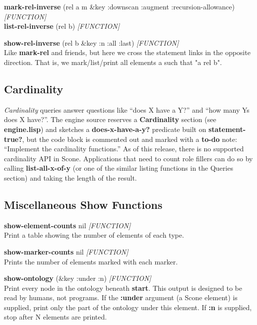 \documentclass[titlepage,twoside,openright,11pt]{article}
\begin{document}
\textbf{mark-rel-inverse} (rel a m \&key :downscan :augment
:recursion-allowance) \emph{{[}FUNCTION{]}\\
}\textbf{list-rel-inverse} (rel b) \emph{{[}FUNCTION{]}}

\textbf{show-rel-inverse} (rel b \&key :n :all :last)
\emph{{[}FUNCTION{]}}\\
Like \textbf{mark-rel} and friends, but here we cross the statement
links in the opposite direction. That is, we mark/list/print all
elements a such that "a rel b".

\subsection{Cardinality}\label{cardinality}

\emph{Cardinality} queries answer questions like ``does X have a Y?''
and ``how many Ys does X have?''. The engine source reserves a
\textbf{Cardinality} section (see \textbf{engine.lisp}) and sketches a
\textbf{does-x-have-a-y?} predicate built on \textbf{statement-true?},
but the code block is commented out and marked with a
\textbf{to-do} note: ``Implement the cardinality functions.'' As of
this release, there is no supported cardinality API in Scone.
Applications that need to count role fillers can do so by calling
\textbf{list-all-x-of-y} (or one of the similar listing functions in
the Queries section) and taking the length of the result.

\subsection{Miscellaneous Show
Functions}\label{miscellaneous-show-functions}

\textbf{show-element-counts} nil \emph{{[}FUNCTION{]}}\\
Print a table showing the number of elements of each type.

\textbf{show-marker-counts} nil \emph{{[}FUNCTION{]}}\\
Prints the number of elements marked with each marker.

\textbf{show-ontology} (\&key :under :n) \emph{{[}FUNCTION{]}}\\
Print every node in the ontology beneath \textbf{start}. This output is
designed to be read by humans, not programs. If the \textbf{:under}
argument (a Scone element) is supplied, print only the part of the
ontology under this element. If \textbf{:n} is supplied, stop after N
elements are printed.
\end{document}
